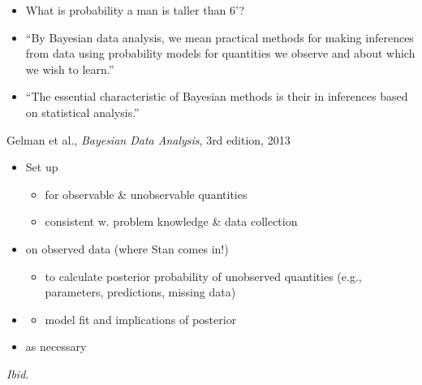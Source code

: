 \documentclass[10pt]{report}
\begin{document}
%
\begin{itemize}
\item What is probability a man is taller than 6'?
\end{itemize}


%
\begin{itemize}
\item ``By {Bayesian data analysis}, we mean {practical methods}
  for making {inferences} from {data} using {probability models}
  for quantities we {observe} and about which we {wish to learn}.''
\item ``The essential characteristic of Bayesian methods is
  their 
  in inferences based on statistical analysis.''
\end{itemize}
%
\vfill\hfill{\footnotesize Gelman et al., {\slshape Bayesian Data Analysis},
  3rd edition, 2013}


%
\begin{itemize}
\item Set up 
  \vspace*{-4pt}
  \begin{itemize}
  \item for  observable \& unobservable quantities
  \item consistent w. problem knowledge \& data collection
  \end{itemize}
\item {} on observed data (where Stan comes in!)
  \vspace*{-4pt}
  \begin{itemize}
  \item to calculate posterior probability of unobserved quantities
    (e.g., parameters, predictions, missing data)
  \end{itemize}
\item {}
  \vspace*{-4pt}
  \begin{itemize}
  \item model fit and implications of posterior
  \end{itemize}
\vfill
\item {} as necessary
\end{itemize}
\vfill\hfill {\footnotesize {\slshape Ibid.}}
\end{document}
